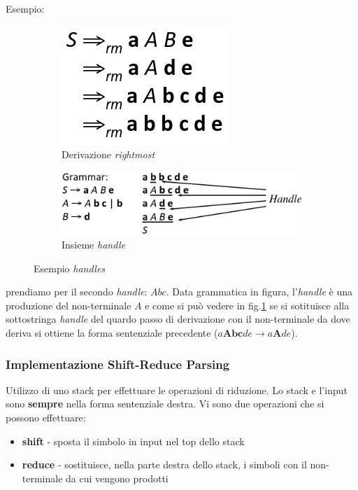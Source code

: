Esempio:
\begin{figure}[H]
    \begin{subfigure}[b]{0.3\textwidth}
        \includegraphics[scale=0.5]{res/image/rightmost}
        \caption{Derivazione \textit{rightmost}}
        \label{fig:rightmost}
    \end{subfigure}
    \quad
    \begin{subfigure}[b]{0.3\textwidth}
        \centering
        \includegraphics[scale=0.4]{res/image/handle}
        \caption{Insieme \textit{handle}}
        \label{fig:handle}
    \end{subfigure}
    \caption{Esempio \textit{handles}}
    \label{img:handles}
\end{figure}
prendiamo per il secondo \textit{handle}: $Abc$. Data grammatica in figura,
l'\textit{handle} \`e una produzione del non-terminale $A$ e come si pu\`o
vedere in fig.\ref{fig:rightmost} se si sotituisce alla sottostringa
\textit{handle} del quardo passo di derivazione con il non-terminale da dove
deriva si ottiene la forma sentenziale precedente ($a\mathbf{Abc}de \to
a\mathbf{A}de$).

\subsubsection{Implementazione Shift-Reduce Parsing}
Utilizzo di uno stack per effettuare le operazioni di riduzione. Lo stack e
l'input sono \textbf{sempre} nella forma sentenziale destra. Vi sono due
operazioni che si possono effettuare:
\begin{itemize}
\item \textbf{shift} - sposta il simbolo in input nel top dello stack
\item \textbf{reduce} - sostituisce, nella parte destra dello stack, i simboli
con il non-terminale da cui vengono prodotti
\end{itemize}

